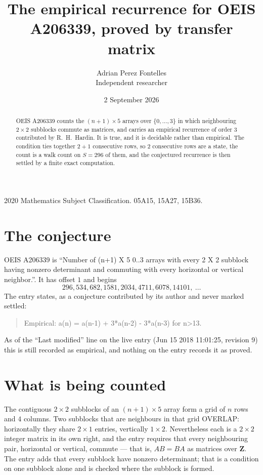 \documentclass[11pt,a4paper]{article}
\title{The empirical recurrence for OEIS A206339, proved by transfer matrix}
\author{Adrian Perez Fontelles\\ \small Independent researcher}
\date{2 September 2026}
\theoremstyle{plain}
\theoremstyle{definition}
\begin{document}
\maketitle

\begin{abstract}
OEIS A206339 counts the $(n+1)\times5$ arrays over $\{0,\dots,3\}$ in which
neighbouring $2\times2$ subblocks commute as matrices, and carries an empirical recurrence
of order $3$ contributed by R.~H.~Hardin. It is true, and it is decidable rather than
empirical. The condition ties together $2+1$ consecutive rows, so $2$ consecutive rows are
a state, the count is a walk count on $S=296$ of them, and the conjectured recurrence is then
settled by a finite exact computation.
\end{abstract}

\noindent\small 2020 Mathematics Subject Classification. 05A15, 15A27, 15B36.\normalsize

\section{The conjecture}

OEIS A206339 is ``Number of (n+1) X 5 0..3 arrays with every 2 X 2 subblock having nonzero determinant and commuting with every horizontal or vertical neighbor.''. It has offset $1$ and begins
\[
296, 534, 682, 1581, 2034, 4711, 6078, 14101,\ \dots
\]
The entry states, as a conjecture contributed by its author and never marked settled:
\begin{quote}
Empirical: a(n) = a(n-1) + 3*a(n-2) - 3*a(n-3) for n>13.
\end{quote}
As of the ``Last modified'' line on the live entry (Jun 15 2018 11:01:25, revision 9) this is still
recorded as empirical, and nothing on the entry records it as proved.

\section{What is being counted}

The contiguous $2\times2$ subblocks of an $(n+1)\times5$ array form a grid of $n$
rows and $4$ columns. Two subblocks that are neighbours in that
grid OVERLAP: horizontally they share $2\times1$ entries, vertically
$1\times2$. Nevertheless each is a $2\times2$ integer matrix in its own right, and
the entry requires that every neighbouring pair, horizontal or vertical, commute --- that is,
$AB=BA$ as matrices over $\mathbf{Z}$. The entry adds that every subblock have nonzero determinant; that is a condition on one subblock alone and is checked where the subblock is formed.
\end{document}
